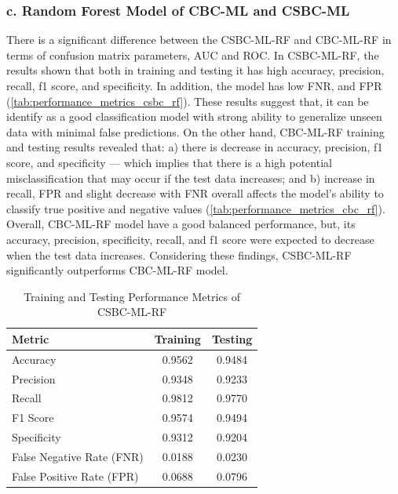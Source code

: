 \subsubsection*{c. Random Forest Model of CBC-ML and CSBC-ML}
There is a significant difference between the CSBC-ML-RF and CBC-ML-RF in terms of confusion matrix parameters, AUC and ROC. In CSBC-ML-RF, the results shown that both in training and testing it has high accuracy, precision, recall, f1 score, and specificity. In addition, the model has low FNR, and FPR (\autoref{tab:performance_metrics_csbc_rf}). These results suggest that,  it can be identify as a good classification model with strong ability to generalize unseen data with minimal false predictions. On the other hand, CBC-ML-RF training and testing results revealed that: a) there is decrease in accuracy, precision, f1 score, and specificity --- which implies that there is a high potential misclassification that may occur if the test data increases; and b) increase in recall, FPR and slight decrease with FNR  overall affects the model's ability to classify true positive and negative values (\autoref{tab:performance_metrics_cbc_rf}). Overall, CBC-ML-RF model have a good balanced performance, but, its accuracy, precision, specificity, recall, and f1 score were expected to decrease when the test data increases. Considering these findings, CSBC-ML-RF significantly outperforms CBC-ML-RF model.    

\begin{table}[h]
\centering
\small
\renewcommand{\arraystretch}{1.2} %

\begin{tabular}{l c c}
\hline
\textbf{Metric} & \textbf{Training} & \textbf{Testing} \\
\hline
Accuracy & 0.9562 & 0.9484 \\
Precision & 0.9348 & 0.9233 \\
Recall & 0.9812 & 0.9770 \\
F1 Score & 0.9574 & 0.9494 \\
Specificity & 0.9312 & 0.9204 \\
False Negative Rate (FNR) & 0.0188 & 0.0230 \\
False Positive Rate (FPR) & 0.0688 & 0.0796 \\
\hline
\end{tabular}

\caption{Training and Testing Performance Metrics of CSBC-ML-RF}
\label{tab:performance_metrics_csbc_rf}
\end{table}

